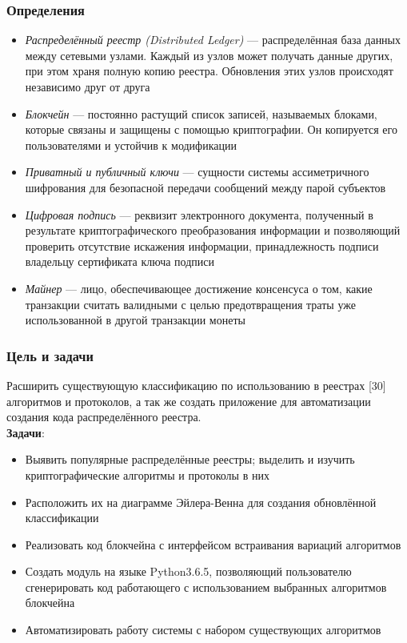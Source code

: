 \documentclass{beamer}
\begin{document}
\begin{frame}
\frametitle{Определения}
\begin{itemize}
\small
    \item \emph{Распределённый реестр (Distributed Ledger)} --- распределённая база
          данных между сетевыми узлами. Каждый из узлов может получать данные
          других, при этом храня полную копию реестра.  Обновления этих
          узлов происходят независимо друг от друга
    \item \emph{Блокчейн} --- постоянно растущий список записей, называемых блоками,
          которые связаны и защищены с помощью криптографии. Он копируется его
          пользователями и устойчив к модификации
    \item \emph{Приватный и публичный ключи} --- сущности системы ассиметричного
          шифрования для безопасной передачи сообщений между парой субъектов
    \item \emph{Цифровая подпись} --- реквизит электронного документа, полученный в
          результате криптографического преобразования информации и позволяющий
          проверить отсутствие искажения информации, принадлежность
          подписи владельцу сертификата ключа подписи
    \item \emph{Майнер} --- лицо, обеспечивающее достижение консенсуса о том,
          какие транзакции считать валидными с целью предотвращения траты уже
          использованной в другой транзакции монеты
\end{itemize}
\end{frame}

\begin{frame}[c]
    \small
    \frametitle{Цель и задачи}
    Расширить существующую классификацию по использованию в реестрах
    [30] алгоритмов и протоколов, а так же создать приложение для
    автоматизации создания кода распределённого реестра.\\

    {\bfseries \color{HSEblue} Задачи}:
    \begin{itemize}
        \item Выявить популярные распределённые реестры; выделить и изучить
              криптографические алгоритмы и протоколы в них
        \item Расположить их на диаграмме Эйлера-Венна для создания обновлённой
              классификации
        \item Реализовать код блокчейна с интерфейсом встраивания вариаций
              алгоритмов
        \item Создать модуль на языке Python3.6.5, позволяющий пользователю
              сгенерировать код работающего с использованием выбранных
              алгоритмов блокчейна
        \item Автоматизировать работу системы с набором существующих алгоритмов
    \end{itemize}
\end{frame}
\end{document}
